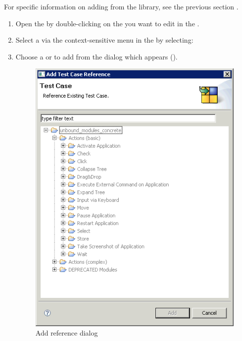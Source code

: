 For specific information on adding \gdcases{} from the library, see the previous section . 
\begin{enumerate}
\item Open the \gdtestcaseeditor{} by double-clicking on the \gdcase{} you want to edit in the \gdtestcasebrowser{}. 
\item Select a \gdcase{} via the context-sensitive menu in the \gdtestcasebrowser{} by selecting:
\\


\item Choose a \gdcase{} or \gdcases{} to add from the dialog which appears ().


\begin{figure}[h]
\begin{center}
\includegraphics{Tasks/Testcases/PS/referencetestcasedialog}
\caption{Add \gdcase{} reference dialog}
\label{referencetestcasedialog}
\end{center}
\end{figure} 


\end{enumerate}

